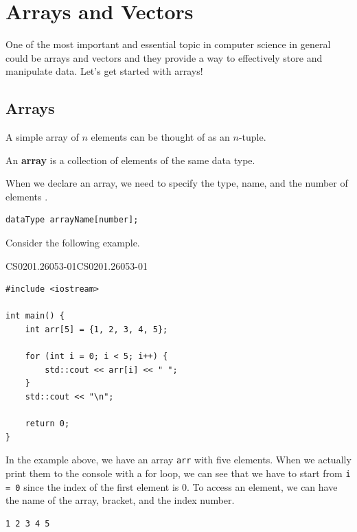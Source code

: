 \documentclass[../../main.tex]{subfiles}
\begin{document}
\section{Arrays and Vectors}

One of the most important and essential topic in computer science
in general could be arrays and vectors and they provide a way
to effectively store and manipulate data. Let's get started with
arrays!

\subsection{Arrays}

A simple array of $n$ elements can be thought of as an $n$-tuple.

\begin{definition}{}{}
An \textbf{array} is a collection of elements of the same
data type.
\end{definition}

When we declare an array, we need to specify the type, name, and
the number of elements \cite{CS02-4}.

\begin{basicbox}
\begin{lstlisting}[style=basic]
dataType arrayName[number];
\end{lstlisting}
\end{basicbox}

Consider the following example.

\begin{cppbox}{CS0201.26053-01}{CS0201.26053-01}
\begin{lstlisting}[style=cppstyle]
#include <iostream>

int main() {
    int arr[5] = {1, 2, 3, 4, 5};

    for (int i = 0; i < 5; i++) {
        std::cout << arr[i] << " ";
    }
    std::cout << "\n";

    return 0;
}
\end{lstlisting}
\end{cppbox}

In the example above, we have an array \verb|arr| with five elements.
When we actually print them to the console with a for loop, we can
see that we have to start from \verb|i = 0| since the index of the
first element is $0$. To access an element, we can have the name
of the array, bracket, and the index number.

\begin{outputbox}
\begin{lstlisting}[style=basic]
1 2 3 4 5
\end{lstlisting}
\end{outputbox}
\end{document}
